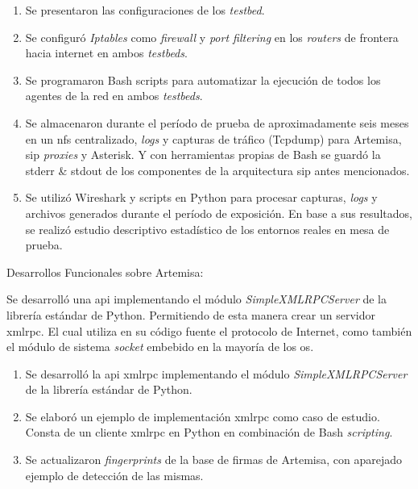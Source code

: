 \documentclass[a4paper,12pt]{report}
\begin{document}
\begin{enumerate}
\begin{enumerate}
  \item Se presentaron las configuraciones de los \emph{testbed}.
   
  \item Se configuró \emph{Iptables} como \emph{firewall} y \emph{port filtering} en los \emph{routers} de
 frontera hacia internet en ambos \emph{testbeds}.
  
  \item Se programaron Bash scripts para automatizar la ejecución de todos los agentes
 de la red en ambos \emph{testbeds}.
  
  \item Se almacenaron durante el período de prueba de aproximadamente seis meses en un \ac{nfs} 
centralizado, \emph{logs} y capturas de tráfico
(\mbox{Tcpdump}) para Artemisa, \ac{sip} \emph{proxies}  y Asterisk. Y con herramientas propias de Bash se guardó 
la \ac{stderr} \& \ac{stdout} de los componentes de la arquitectura \ac{sip} antes mencionados.

  \item Se utilizó Wireshark y scripts en Python para procesar capturas, \emph{logs} y archivos generados
durante el período de exposición. En base a sus resultados, se realizó estudio descriptivo estadístico de 
los entornos reales en mesa de prueba. 

\end{enumerate}

{\bf \item Desarrollos Funcionales sobre Artemisa:}

Se desarrolló una \ac{api} implementando el módulo
\emph{SimpleXMLRPCServer} de la librería estándar de Python. Permitiendo de esta
manera crear un servidor \ac{xmlrpc}. El cual utiliza en su código fuente el
protocolo de Internet, como también el módulo de sistema \emph{socket} embebido
en la mayoría de los \ac{os}.

\begin{enumerate}

  \item Se desarrolló la \ac{api} \ac{xmlrpc} implementando el módulo \emph{SimpleXMLRPCServer} de la librería estándar de Python.

  \item Se elaboró un ejemplo de implementación \ac{xmlrpc} como caso de estudio. Consta de un cliente \ac{xmlrpc} en Python en
combinación de Bash \emph{scripting}. 

  \item Se actualizaron \emph{fingerprints} de la base de firmas de Artemisa, con aparejado ejemplo de detección de las mismas.


\end{enumerate}
\end{enumerate}
\end{document}
